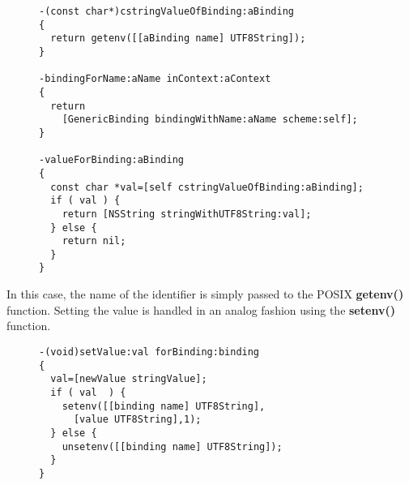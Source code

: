 \documentclass[preprint,authoryear]{acm_proc_article-sp}
\begin{document}
\begin{figure}[htbp]
\begin{lstlisting}[style=L,label=get-env,caption=Basic lookup in env: scheme.]
-(const char*)cstringValueOfBinding:aBinding
{
  return getenv([[aBinding name] UTF8String]);
}

-bindingForName:aName inContext:aContext
{
  return
    [GenericBinding bindingWithName:aName scheme:self];
}

-valueForBinding:aBinding
{
  const char *val=[self cstringValueOfBinding:aBinding];
  if ( val ) {
    return [NSString stringWithUTF8String:val];
  } else {
    return nil;
  }
}
\end{lstlisting}
\end{figure}

In this case, the name of the identifier is simply passed to the POSIX {\bf getenv()} function.
Setting the value is handled in an analog fashion using the {\bf setenv()} function.


\begin{figure}[htbp]
\begin{lstlisting}[style=L,label=setvalue-env,caption=Set value in env: scheme.]
-(void)setValue:val forBinding:binding
{
  val=[newValue stringValue];
  if ( val  ) {
    setenv([[binding name] UTF8String],
      [value UTF8String],1);
  } else {
    unsetenv([[binding name] UTF8String]);
  }
}
\end{lstlisting}
\end{figure}

\end{document}
